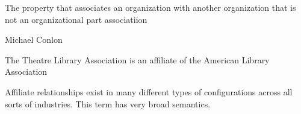 \documentclass[letterpaper,10pt,english]{sphinxmanual}
\begin{document}
\begin{sphinxShadowBox}

\sphinxAtStartPar
{}
\end{sphinxShadowBox}

\begin{sphinxShadowBox}

\sphinxAtStartPar
The property that associates an organization with another organization that is not an organizational part associatiion
\end{sphinxShadowBox}

\begin{sphinxShadowBox}

\sphinxAtStartPar
Michael Conlon 
\end{sphinxShadowBox}

\begin{sphinxShadowBox}

\sphinxAtStartPar
{\hyperref[\detokenize{doc-ORG_0000001::doc}]{}}
\end{sphinxShadowBox}

\begin{sphinxShadowBox}

\sphinxAtStartPar
{\hyperref[\detokenize{doc-ORG_0000001::doc}]{}}
\end{sphinxShadowBox}

\begin{sphinxShadowBox}

\sphinxAtStartPar
The Theatre Library Association is an affiliate of the American Library Association
\end{sphinxShadowBox}

\begin{sphinxShadowBox}

\sphinxAtStartPar
Affiliate relationships exist in many different types of configurations across all sorts of industries.  This term has very broad semantics.
\end{sphinxShadowBox}

\begin{sphinxShadowBox}

\sphinxAtStartPar
{}
\end{sphinxShadowBox}
\end{document}
